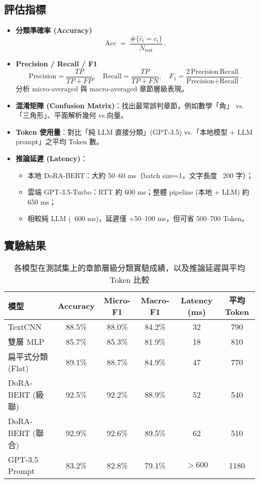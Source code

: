 \documentclass[10pt]{article}
\begin{document}
\begin{CJK}{UTF8}{bsmi}
\subsection{評估指標}
\begin{itemize}
  \item \textbf{分類準確率 (Accuracy)}  
    \[
      \mathrm{Acc} \;=\; \frac{\#\{\hat{c}_i = c_i\}}{N_\text{test}}\,.
    \]
  \item \textbf{Precision / Recall / F1}  
    \[
      \text{Precision} = \frac{TP}{TP + FP},\quad
      \text{Recall}    = \frac{TP}{TP + FN},\quad
      F_{1}           = \frac{2\,\text{Precision}\,\text{Recall}}{\text{Precision} + \text{Recall}}\,.
    \]
    分析 micro-averaged 與 macro-averaged 章節層級表現。  
  \item \textbf{混淆矩陣 (Confusion Matrix)}：找出最常誤判章節，例如數學「角」 vs.「三角形」、平面解析幾何 vs.向量。  
  \item \textbf{Token 使用量}：對比「純 LLM 直接分類」(GPT-3.5) vs.「本地模型 + LLM prompt」之平均 Token 數。  
  \item \textbf{推論延遲 (Latency)}：  
    \begin{itemize}
      \item 本地 DoRA-BERT：大約 50–60 ms（batch size=1，文字長度 ~200 字）；  
      \item 雲端 GPT-3.5-Turbo：RTT 約 600 ms；整體 pipeline (本地 + LLM) 約 650 ms；  
      \item 相較純 LLM (~600 ms)，延遲僅 +50–100 ms，但可省 500–700 Token。
    \end{itemize}
\end{itemize}

\subsection{實驗結果}
\begin{table}[h]
  \small  %
  \centering
  \begin{tabular}{@{}lccccc@{}}
    \toprule
    \textbf{模型}     & \textbf{Accuracy} & \textbf{Micro-F1} & \textbf{Macro-F1} & \textbf{Latency (ms)} & \textbf{平均 Token} \\
    \midrule
    TextCNN          & 88.5\%   & 88.0\%   & 84.2\%   & 32    & 790   \\
    雙層 MLP         & 85.7\%   & 85.3\%   & 81.9\%   & 18    & 810   \\
    扁平式分類 (Flat) & 89.1\%   & 88.7\%   & 84.9\%   & 47    & 770   \\
    DoRA‐BERT (級聯)  & 92.5\%   & 92.2\%   & 88.9\%   & 52    & 540   \\
    DoRA‐BERT (聯合)  & 92.9\%   & 92.6\%   & 89.5\%   & 62    & 510   \\
    GPT-3.5 Prompt   & 83.2\%   & 82.8\%   & 79.1\%   & $>600$ & 1180  \\
    \bottomrule
  \end{tabular}
  \caption{各模型在測試集上的章節層級分類實驗成績，以及推論延遲與平均 Token 比較}
\end{table}


\end{CJK}
\end{document}
